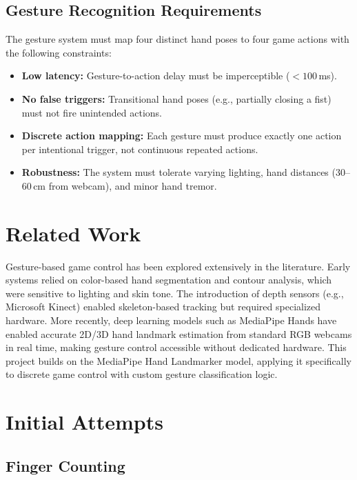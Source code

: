 \documentclass[conference]{IEEEtran}
\begin{document}
\subsection{Gesture Recognition Requirements}

The gesture system must map four distinct hand poses to four game actions with the following constraints:

\begin{itemize}
    \item \textbf{Low latency:} Gesture-to-action delay must be imperceptible ($< 100$\,ms).
    \item \textbf{No false triggers:} Transitional hand poses (e.g., partially closing a fist) must not fire unintended actions.
    \item \textbf{Discrete action mapping:} Each gesture must produce exactly one action per intentional trigger, not continuous repeated actions.
    \item \textbf{Robustness:} The system must tolerate varying lighting, hand distances (30--60\,cm from webcam), and minor hand tremor.
\end{itemize}

\section{Related Work}

Gesture-based game control has been explored extensively in the literature. Early systems relied on color-based hand segmentation and contour analysis, which were sensitive to lighting and skin tone. The introduction of depth sensors (e.g., Microsoft Kinect) enabled skeleton-based tracking but required specialized hardware. More recently, deep learning models such as MediaPipe Hands have enabled accurate 2D/3D hand landmark estimation from standard RGB webcams in real time, making gesture control accessible without dedicated hardware. This project builds on the MediaPipe Hand Landmarker model, applying it specifically to discrete game control with custom gesture classification logic.

\section{Initial Attempts}

\subsection{Finger Counting}
\end{document}
